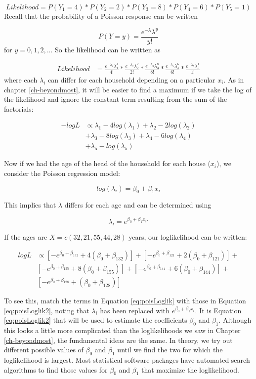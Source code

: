 \documentclass[
]{krantz}
\begin{document}
\[ Likelihood = P(Y_1=4)*P(Y_2=2)*P(Y_3=8)*P(Y_4=6)*P(Y_5=1)\]
Recall that the probability of a Poisson response can be written

\[P(Y=y)=\frac{e^{-\lambda}\lambda^y}{y!}\]
for \(y = 0, 1, 2, ...\) So the likelihood can be written as

\begin{align*}
 Likelihood&= \frac{ e^{-\lambda_1}\lambda_1^4 }{ 4! }*
 \frac{ e^{-\lambda_2}\lambda_2^2 }{ 2! } *\frac{e^{-\lambda_3}\lambda_3^8}{8!}*
 \frac{e^{-\lambda_4}\lambda_4^6}{6!}*\frac{e^{-\lambda_5}\lambda_5^1}{1!}
 \end{align*}
where each \(\lambda_i\) can differ for each household depending on a particular \(x_i\). As in chapter \ref{ch-beyondmost}, it will be easier to find a maximum if we take the log of the likelihood and ignore the constant term resulting from the sum of the factorials:

\begin{align}
 -logL& \propto \lambda_{1}-4log(\lambda_{1})+\lambda_{2}-2log(\lambda_{2}) \nonumber \\
 & +\lambda_{3}-8log(\lambda_{3})+\lambda_{4}-6log(\lambda_{4}) \nonumber \\
 & +\lambda_{5}-log(\lambda_{5})
 \label{eq:poisLoglik}
\end{align}

Now if we had the age of the head of the household for each house (\(x_i\)), we consider the Poisson regression model:

\[log(\lambda_i)=\beta_0+\beta_1x_i \]

This implies that \(\lambda\) differs for each age and can be determined using

\[\lambda_i=e^{\beta_0+\beta_1x_i.}\]

If the ages are \(X=c(32,21,55,44,28)\) years, our loglikelihood can be written:

\begin{align}
 logL & \propto [-e^{\beta_0+\beta_132}+4({\beta_0+\beta_132})]+
[-e^{\beta_0+\beta_121}+2({\beta_0+\beta_121})]+ \nonumber \\ 
&  [-e^{\beta_0+\beta_155}+8({\beta_0+\beta_155})]+
[-e^{\beta_0+\beta_144}+6({\beta_0+\beta_144})]+ \nonumber \\
  &  [-e^{\beta_0+\beta_128}+({\beta_0+\beta_128})]
\label{eq:poisLoglik2}
\end{align}

To see this, match the terms in Equation \eqref{eq:poisLoglik} with those in Equation \eqref{eq:poisLoglik2}, noting that \(\lambda_i\) has been replaced with \(e^{\beta_0+\beta_1x_i}\). It is Equation \eqref{eq:poisLoglik2} that will be used to estimate the coefficients \(\beta_0\) and \(\beta_1\). Although this looks a little more complicated than the loglikelihoods we saw in Chapter \ref{ch-beyondmost}, the fundamental ideas are the same. In theory, we try out different possible values of \(\beta_0\) and \(\beta_1\) until we find the two for which the loglikelihood is largest. Most statistical software packages have automated search algorithms to find those values for \(\beta_0\) and \(\beta_1\) that maximize the loglikelihood.
\end{document}
